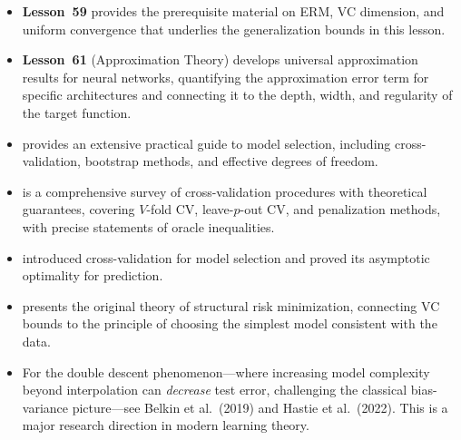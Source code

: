 \documentclass[11pt,a4paper]{article}
\begin{document}
\begin{itemize}
    \item \textbf{Lesson~59} provides the prerequisite material on
    ERM, VC dimension, and uniform convergence that underlies the
    generalization bounds in this lesson.
    \item \textbf{Lesson~61} (Approximation Theory) develops
    universal approximation results for neural networks, quantifying
    the approximation error term for specific architectures and
    connecting it to the depth, width, and regularity of the target
    function.
    \item \citet[Chapter 7]{hastie2009} provides an extensive
    practical guide to model selection, including cross-validation,
    bootstrap methods, and effective degrees of freedom.
    \item \citet{arlot2010} is a comprehensive survey of
    cross-validation procedures with theoretical guarantees,
    covering $V$-fold CV, leave-$p$-out CV, and penalization
    methods, with precise statements of oracle inequalities.
    \item \citet{stone1974} introduced cross-validation for model
    selection and proved its asymptotic optimality for prediction.
    \item \citet[Chapter 7]{vapnik1998} presents the original theory
    of structural risk minimization, connecting VC bounds to the
    principle of choosing the simplest model consistent with the data.
    \item For the double descent phenomenon---where increasing model
    complexity beyond interpolation can \emph{decrease} test
    error, challenging the classical bias-variance picture---see
    Belkin et al.\ (2019) and Hastie et al.\ (2022).  This is a
    major research direction in modern learning theory.
\end{itemize}


\end{document}
